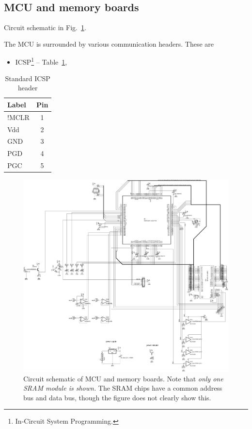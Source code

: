 \documentclass[letterpaper]{article}
\begin{document}
\subsection{MCU and memory boards}
\label{mcumemhardware:sec}

Circuit schematic in Fig.~\ref{mcubrd_schem:fig}.

The MCU is surrounded by various communication headers. These are
\begin{itemize}
\item ICSP\footnote{In-Circuit System Programming.} --
  Table~\ref{icsp_hdr:tbl},
\end{itemize}

\begin{table}[h]
\caption{Standard ICSP header}
\label{icsp_hdr:tbl}
\centering
\begin{tabular}{|l|c|}
\hline
\textbf{Label}&\textbf{Pin}\\
\hline
\hline
!MCLR & 1\\
\hline
Vdd & 2\\
\hline
GND & 3\\
\hline
PGD & 4\\
\hline
PGC & 5\\
\hline
\end{tabular}
\end{table}

\begin{figure}
\centering
\includegraphics[width=\textwidth]{figures/mcu_board_schematic.png}
\caption[Circuit schematic of microcontroller and memory
  boards]{Circuit schematic of MCU and memory boards. Note that
  \textit{only one SRAM module is shown.} The SRAM chips have a common
  address bus and data bus, though the figure does not clearly show
  this.}
\label{mcubrd_schem:fig}
\end{figure}
\end{document}
